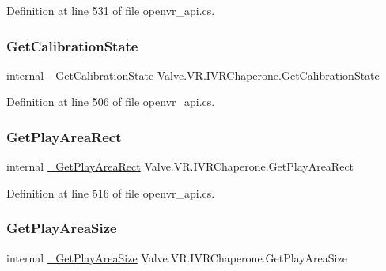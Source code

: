 Definition at line 531 of file openvr\+\_\+api.\+cs.

\mbox{\label{struct_valve_1_1_v_r_1_1_i_v_r_chaperone_a0c4eddaed9adf7789b4722c2b66e75d9}} 
\subsubsection{\texorpdfstring{GetCalibrationState}{GetCalibrationState}}
{\footnotesize\ttfamily internal \mbox{\hyperlink{struct_valve_1_1_v_r_1_1_i_v_r_chaperone_ae940ed5f0954e57503fd3c59e6a52bbd}{\+\_\+\+Get\+Calibration\+State}} Valve.\+V\+R.\+I\+V\+R\+Chaperone.\+Get\+Calibration\+State}



Definition at line 506 of file openvr\+\_\+api.\+cs.

\mbox{\label{struct_valve_1_1_v_r_1_1_i_v_r_chaperone_a4586ae0d839568f24485414975d0f51d}} 
\subsubsection{\texorpdfstring{GetPlayAreaRect}{GetPlayAreaRect}}
{\footnotesize\ttfamily internal \mbox{\hyperlink{struct_valve_1_1_v_r_1_1_i_v_r_chaperone_a489fd7799318412b5ecf95dba2dadc6a}{\+\_\+\+Get\+Play\+Area\+Rect}} Valve.\+V\+R.\+I\+V\+R\+Chaperone.\+Get\+Play\+Area\+Rect}



Definition at line 516 of file openvr\+\_\+api.\+cs.

\mbox{\label{struct_valve_1_1_v_r_1_1_i_v_r_chaperone_a4293e2f9b2d3ce4109520e2255d651e5}} 
\subsubsection{\texorpdfstring{GetPlayAreaSize}{GetPlayAreaSize}}
{\footnotesize\ttfamily internal \mbox{\hyperlink{struct_valve_1_1_v_r_1_1_i_v_r_chaperone_a2eada0fcf01f701837846219447de33d}{\+\_\+\+Get\+Play\+Area\+Size}} Valve.\+V\+R.\+I\+V\+R\+Chaperone.\+Get\+Play\+Area\+Size}



